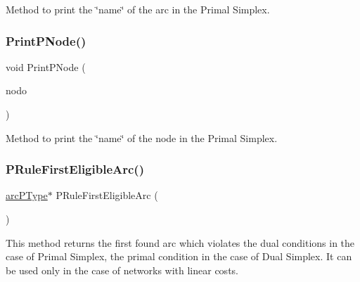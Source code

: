 Method to print the \char`\"{}name\char`\"{} of the arc in the Primal Simplex. \mbox{\label{class_m_c_f_simplex_a875ea0070b80aa1a6e6eaefb6eef6efd}} 
\subsubsection{\texorpdfstring{Print\+P\+Node()}{PrintPNode()}}
{\footnotesize\ttfamily void Print\+P\+Node (\begin{DoxyParamCaption}\item[{\mbox{\hyperlink{struct_m_c_f_simplex_1_1node_p_type}{node\+P\+Type}} $\ast$}]{nodo }\end{DoxyParamCaption})\hspace{0.3cm}{\ttfamily [private]}}

Method to print the \char`\"{}name\char`\"{} of the node in the Primal Simplex. \mbox{\label{class_m_c_f_simplex_ae2b248931e87ec84f096dc4da828e1f2}} 
\subsubsection{\texorpdfstring{P\+Rule\+First\+Eligible\+Arc()}{PRuleFirstEligibleArc()}}
{\footnotesize\ttfamily \mbox{\hyperlink{struct_m_c_f_simplex_1_1arc_p_type}{arc\+P\+Type}}$\ast$ P\+Rule\+First\+Eligible\+Arc (\begin{DoxyParamCaption}\item[{void}]{ }\end{DoxyParamCaption})\hspace{0.3cm}{\ttfamily [private]}}

This method returns the first found arc which violates the dual conditions in the case of Primal Simplex, the primal condition in the case of Dual Simplex. It can be used only in the case of networks with linear costs. \mbox{\label{class_m_c_f_simplex_acd4ca9a93468922d29b4f57f17e1324d}} 
